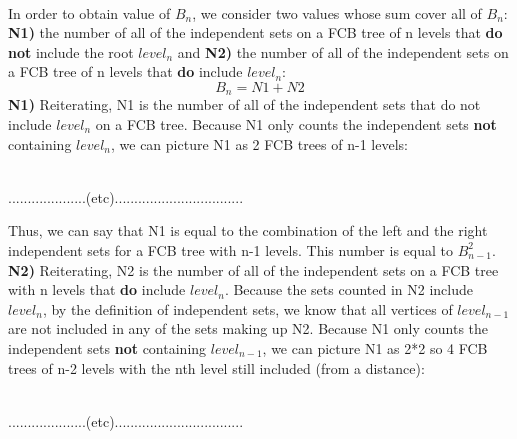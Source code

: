 \documentclass[11pt, solution, letterpaper]{format}
\begin{document}
\\

In order to obtain value of $B_n$, we consider two values whose sum cover all of $B_n$: \textbf{N1)} the number of all of the independent sets on a FCB tree of n levels that \textbf{do not} include the root $level_n$ and \textbf{N2)} the number of all of the independent sets on a FCB tree of n levels that \textbf{do} include $level_n$: $$B_n = N1 + N2$$
\textbf{N1)} Reiterating, N1 is the number of all of the independent sets that do not include $level_n$ on a FCB tree. Because N1 only counts the independent sets \textbf{not} containing $level_n$, we can picture N1 as 2 FCB trees of n-1 levels:
\begin{center}
\\
....................(etc).................................
\end{center}

Thus, we can say that N1 is equal to the combination of the left and the right independent sets for a FCB tree with n-1 levels. This number is equal to $B_{n-1}^2$. \\

\textbf{N2)} Reiterating, N2 is the number of all of the independent sets on a FCB tree with n levels that \textbf{do} include $level_n$. Because the sets counted in N2 include $level_n$, by the definition of independent sets, we know that all vertices of $level_{n-1}$ are not included in any of the sets making up N2. Because N1 only counts the independent sets \textbf{not} containing $level_{n-1}$, we can picture N1 as 2*2 so 4 FCB trees of n-2 levels with the nth level still included (from a distance):

\begin{center}
\\
....................(etc).................................
\end{center}
\end{document}
